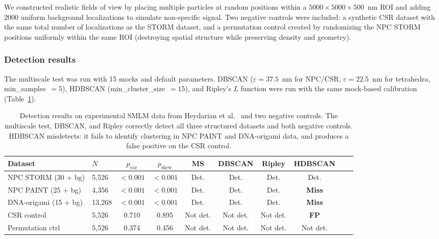 \documentclass[11pt]{article}
\begin{document}
We constructed realistic fields of view by placing multiple particles
at random positions within a $5000 \times 5000 \times 500$~nm ROI and
adding 2000 uniform background localizations to simulate non-specific
signal. Two negative controls were included: a synthetic CSR dataset
with the same total number of localizations as the STORM dataset, and a
permutation control created by randomizing the NPC STORM positions
uniformly within the same ROI (destroying spatial structure while
preserving density and geometry).

\subsubsection{Detection results}

The multiscale test was run with 15 mocks and default parameters.
DBSCAN ($\varepsilon = 37.5$~nm for NPC/CSR, $\varepsilon = 22.5$~nm
for tetrahedra, min\_samples~$= 5$), HDBSCAN
(min\_cluster\_size~$= 15$), and Ripley's $L$ function were run with
the same mock-based calibration (Table~\ref{tab:experimental}).

\begin{table}[ht]
\centering
\caption{Detection results on experimental SMLM data from
  Heydarian et al.\ \citep{heydarian2021} and two negative controls.
  The multiscale test, DBSCAN, and Ripley correctly detect all three
  structured datasets and both negative controls. HDBSCAN misdetects:
  it fails to identify clustering in NPC PAINT and DNA-origami data,
  and produces a false positive on the CSR control.}
\label{tab:experimental}
\begin{tabular}{llcccccccc}
\toprule
Dataset & $N$ & $p_\mathrm{var}$ & $p_\mathrm{skew}$ & MS & DBSCAN & Ripley & HDBSCAN \\
\midrule
NPC STORM (30 + bg) & 5,526 & $< 0.001$ & $< 0.001$ & Det. & Det. & Det. & Det. \\
NPC PAINT (25 + bg) & 4,356 & $< 0.001$ & $< 0.001$ & Det. & Det. & Det. & \textbf{Miss} \\
DNA-origami (15 + bg) & 13,268 & $< 0.001$ & $< 0.001$ & Det. & Det. & Det. & \textbf{Miss} \\
CSR control & 5,526 & 0.710 & 0.895 & Not det. & Not det. & Not det. & \textbf{FP} \\
Permutation ctrl & 5,526 & 0.374 & 0.456 & Not det. & Not det. & Not det. & Not det. \\
\bottomrule
\end{tabular}
\end{table}
\end{document}
